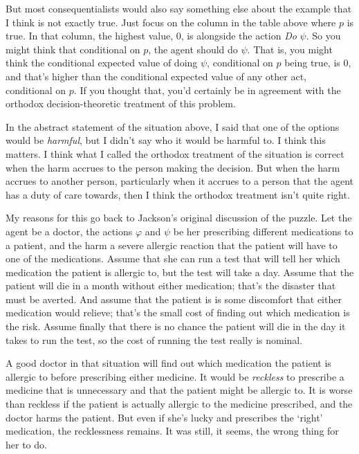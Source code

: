 \documentclass[11pt,oneside]{book}
\begin{document}
But most consequentialists would also say something else about the example that I think is not exactly true. Just focus on the column in the table above where $p$ is true. In that column, the highest value, 0, is alongside the action \textit{Do} $\psi$. So you might think that conditional on $p$, the agent should do $\psi$. That is, you might think the conditional expected value of doing $\psi$, conditional on $p$ being true, is 0, and that's higher than the conditional expected value of any other act, conditional on $p$. If you thought that, you'd certainly be in agreement with the orthodox decision-theoretic treatment of this problem.

In the abstract statement of the situation above, I said that one of the options would be \textit{harmful}, but I didn't say who it would be harmful to. I think this matters. I think what I called the orthodox treatment of the situation is correct when the harm accrues to the person making the decision. But when the harm accrues to another person, particularly when it accrues to a person that the agent has a duty of care towards, then I think the orthodox treatment isn't quite right.

My reasons for this go back to Jackson's original discussion of the puzzle. Let the agent be a doctor, the actions $\varphi$ and $\psi$ be her prescribing different medications to a patient, and the harm a severe allergic reaction that the patient will have to one of the medications. Assume that she can run a test that will tell her which medication the patient is allergic to, but the test will take a day. Assume that the patient will die in a month without either medication; that's the disaster that must be averted. And assume that the patient is is some discomfort that either medication would relieve; that's the small cost of finding out which medication is the risk. Assume finally that there is no chance the patient will die in the day it takes to run the test, so the cost of running the test really is nominal.

A good doctor in that situation will find out which medication the patient is allergic to before prescribing either medicine. It would be \textit{reckless} to prescribe a medicine that is unnecessary and that the patient might be allergic to. It is worse than reckless if the patient is actually allergic to the medicine prescribed, and the doctor harms the patient. But even if she's lucky and prescribes the `right' medication, the recklessness remains. It was still, it seems, the wrong thing for her to do.
\end{document}

